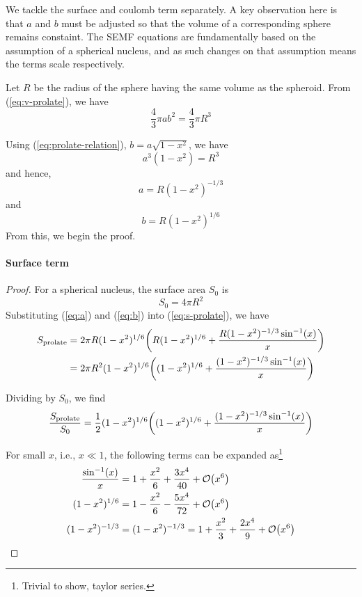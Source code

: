 \documentclass[12pt,a4paper]{article}
\begin{document}
	\begin{solution_pset}
		We tackle the surface and coulomb term separately. A key 
		observation here is that $a$ and $b$ must be adjusted so that the 
		volume of a corresponding sphere remains constaint. The SEMF equations are fundamentally 
		based on the assumption of a spherical nucleus, and as such changes on that assumption
		means the terms scale respectively. 

		Let $R$ be the radius of the sphere
		having the same volume as the spheroid. From (\ref{eq:v-prolate}), we have
		\[
			\frac{4}{3}\pi ab^2 = \frac{4}{3}\pi R^3  
		\]
		
		Using (\ref{eq:prolate-relation}), $b = a\sqrt{1- x^2}$, we have
		\[
			a^3(1-x^2) = R^3
		\]
		and hence,
		\begin{equation}
			\label{eq:a}
			a = 
			R(1-x^2)^{-1/3}
		\end{equation}
		and
		\begin{equation}
			\label{eq:b}
			b = R(1-x^2)^{1/6}
		\end{equation}
		From this, we begin the proof.
		\paragraph{Surface term}
		\begin{proof}
		   For a spherical nucleus, the surface area $S_0$ is
		   \[
				S_0 = 4\pi R^2
		   \]	
		   Substituting (\ref{eq:a}) and (\ref{eq:b}) into (\ref{eq:s-prolate}), we have
		   \begin{align*}
			    S_\text{prolate} 
				&= 
				2\pi 
				R(1-x^2)^{1/6}
				\pqty{
					R(1-x^2)^{1/6}
					+ \frac{
						R(1-x^2)^{-1/3}
						\sin\inv(x)
					}{x} 
				}\\
				&=
				2\pi 
				R^2(1-x^2)^{1/6}
				\pqty{
					(1-x^2)^{1/6}
					+ \frac{
						(1-x^2)^{-1/3}
						\sin\inv(x)
					}{x} 
				}
		   \end{align*}

		   Dividing by $S_0$, we find
		   \begin{equation}
		   	\label{eq:SprolateS0}
			   \frac{
					S_\text{prolate} 
				}{
					S_0
				} 
				=
				\frac{1}{2} 
				(1-x^2)^{1/6}
				\pqty{
					(1-x^2)^{1/6}
					+ \frac{
						(1-x^2)^{-1/3}
						\sin\inv(x)
					}{x} 
				}
		   \end{equation}

		   For small $x$, i.e., $x\ll 1$, the following terms can be expanded as\footnote{Trivial to show, taylor series.}
		   \begin{align*}
			   \frac{
				   \sin\inv(x)
			   }{
				   x
			   } 
			   &= 
			   1 + \frac{x^2}{6} + \frac{3x^4}{40} + \order{x^6}\\
			   (1-x^2)^{1/6} 
			   &= 
			   1 - \frac{x^2}{6} - \frac{5x^4}{72} + \order{x^6} \\
			   (1-x^2)^{-1/3} 
			   &=
			   (1-x^2)^{-1/3} = 1 + \frac{x^2}{3} + \frac{2x^4}{9} + \order{x^6}
		   \end{align*}


\end{proof}
\end{solution_pset}
\end{document}
